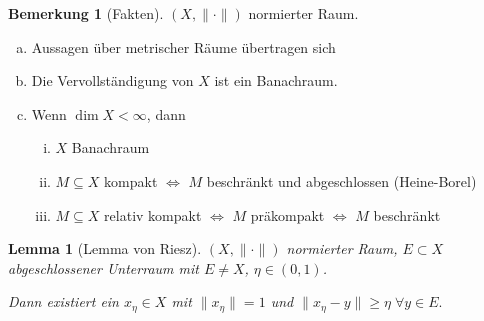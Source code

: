 \documentclass[ngerman]{report}
\theoremstyle{plain}%
\newtheorem{lemma}[thm]{Lemma}
\theoremstyle{definition}%
\theoremstyle{myStyle}
\newtheorem{bem}[thm]{Bemerkung}
\newcommand{\norm}[1]{\|#1\|}
\newcommand{\aq}{\Leftrightarrow} %
\begin{document}
	\begin{bem}[Fakten]
		$(X,\norm{\cdot})$ normierter Raum.
		\begin{enumerate}[a)]
			\item Aussagen über metrischer Räume übertragen sich
			\item Die Vervollständigung von $X$ ist ein Banachraum.
			\item Wenn $\dim X < \infty$, dann
				\begin{enumerate}[i)]
					\item $X$ Banachraum
					\item $M\subseteq X$ kompakt $\aq$ $M$ beschränkt und abgeschlossen (Heine-Borel)
					\item $M\subseteq X$ relativ kompakt $\aq$ $M$ präkompakt  $\aq$ $M$ beschränkt
				\end{enumerate}
		\end{enumerate}
	\end{bem}
\newcommand{\xt}{x_\eta}%

	\begin{lemma}[Lemma von Riesz]%
		$(X,\norm{\cdot})$ normierter Raum, $E\subset X$ abgeschlossener Unterraum mit $E \not = X$, $\eta\in (0,1)$. \par
		Dann existiert ein $x_\eta \in X$ mit $\norm{\xt} = 1$ und $\norm{\xt - y} \geq \eta \; \forall y\in E.$
	\end{lemma}
\end{document}
